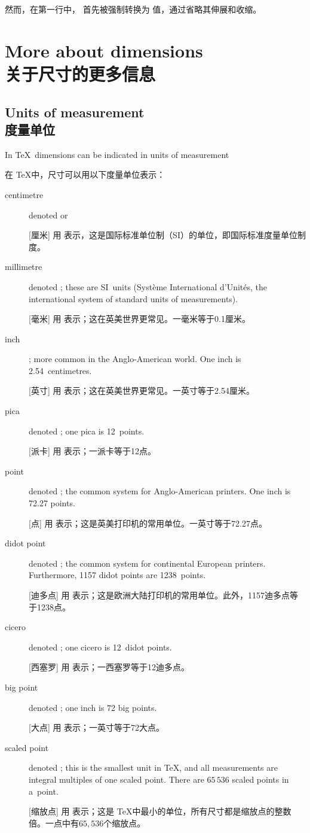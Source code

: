 然而，在第一行中， 首先被强制转换为  值，通过省略其伸展和收缩。


\section{More about dimensions\\关于尺寸的更多信息}

\subsection{Units of measurement\\度量单位}

In \TeX\ dimensions can be indicated in
\term units of measurement\par

在 \TeX 中，尺寸可以用以下度量单位表示：
\begin{description} \item [centimetre]
    denoted  or 

    [厘米] 用  表示，这是国际标准单位制（SI）的单位，即国际标准度量单位制度。
\item [millimetre]
	denoted ; these are SI~units ({\italic Syst\`eme International
	d'Unit\'es}, the
	international system of standard units of measurements).

      [毫米] 用  表示；这在英美世界更常见。一毫米等于0.1厘米。
\item [inch]
; more common in the Anglo-American world.
One inch is 2.54~centimetres.

[英寸] 用  表示；这在英美世界更常见。一英寸等于2.54厘米。
\item [pica]
    denoted ; one pica is 12~points.

    [派卡] 用  表示；一派卡等于12点。
\item [point]
    denoted ; the common system
for Anglo-American printers. One inch is 72.27 points.

[点] 用  表示；这是英美打印机的常用单位。一英寸等于72.27点。
\item [didot point]
    denoted ; the common system for continental European printers.
    Furthermore, 1157 didot points are 1238~points.

    [迪多点] 用  表示；这是欧洲大陆打印机的常用单位。此外，1157迪多点等于1238点。
\item [cicero]
    denoted ; one cicero is 12~didot points.

    [西塞罗] 用  表示；一西塞罗等于12迪多点。
\item [big point]
    denoted ; one inch is 72 big points.

    [大点] 用  表示；一英寸等于72大点。
\item [scaled point]
    denoted ; this is the smallest unit in \TeX, and all measurements
    are integral multiples of one scaled point.
    There are $65\,536$ scaled points in a~point.

    [缩放点] 用  表示；这是 \TeX 中最小的单位，所有尺寸都是缩放点的整数倍。一点中有$65,536$个缩放点。
\end{description}

